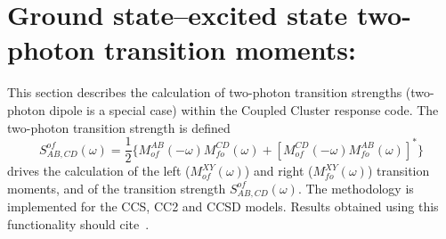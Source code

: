 
\section{Ground state--excited state two-photon transition moments:
} \label{sec:ccsm}
This section describes the calculation of 
two-photon transition strengths 
(two-photon dipole is a special case) 
within the Coupled Cluster response code.
The two-photon transition strength is defined
\[
S^{of}_{AB,CD}(\omega) = \frac{1}{2} \{ M^{AB}_{of}(-\omega) M^{CD}_{fo}(\omega)
                         +[M^{CD}_{of}(-\omega) M^{AB}_{fo}(\omega)]^\ast\}
\]
 drives the calculation of the left ($M^{XY}_{of}(\omega)$)
and right ($M^{XY}_{fo}(\omega)$) transition moments, and of the transition 
strength $S^{of}_{AB,CD}(\omega)$.
The methodology is implemented for the CCS, CC2 and CCSD models.
Results obtained using this functionality should cite~\cite{}.
